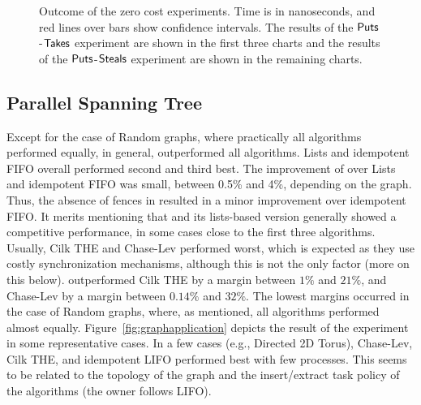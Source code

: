 \begin{figure}[!ht]
{  }

  \caption{\label{fig:zerocost} Outcome of the zero cost experiments. Time is in nanoseconds, and red lines over bars show confidence intervals. The results of the ${\sf Puts}$-${\sf Takes}$ experiment are shown in the first three charts and the results of the ${\sf Puts}$-${\sf Steals}$ experiment are shown in the remaining charts.}

\end{figure}


\subsection{Parallel Spanning Tree}


Except for the case of Random graphs, where practically all algorithms performed equally, in general, \NCWSM{} outperformed all algorithms.  \NCWSM Lists and idempotent FIFO overall performed second and third best. The improvement of \NCWSM{} over \NCWSM Lists and idempotent FIFO was small, between 0.5\% and 4\%, depending on the graph. Thus, the absence of fences in \NCWSM{} resulted in a minor improvement over idempotent FIFO. It merits mentioning that \BNCWSM and its lists-based version generally showed a competitive performance, in some cases close to the first three algorithms. Usually, Cilk THE and Chase-Lev performed worst, which is expected as they use costly synchronization mechanisms, although this is not the only factor (more on this below).  \NCWSM outperformed Cilk THE by a margin between $1\%$ and $21\%$, and Chase-Lev by a margin between $0.14\%$ and $32\%$.  The lowest margins occurred in the case of Random graphs, where, as mentioned, all algorithms performed almost equally. Figure~\ref{fig:graphapplication} depicts the result of the experiment in some representative cases. In a few cases (e.g., Directed 2D Torus), Chase-Lev, Cilk THE, and idempotent LIFO performed best with few processes. This seems to be related to the topology of the graph and the insert/extract task policy of the algorithms (the owner follows LIFO).

